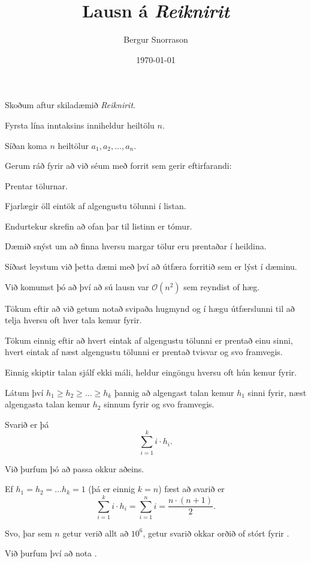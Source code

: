 \title{Lausn á \emph{Reiknirit}}
\author{Bergur Snorrason}
\date{\today}



\frame{\titlepage}

{
	{
		\item<1-> Skoðum aftur skiladæmið \emph{Reiknirit}.
		\item<2-> Fyrsta lína inntaksins inniheldur heiltölu $n$.
		\item<3-> Síðan koma $n$ heiltölur $a_1, a_2, \dots, a_n$.
		\item<4-> Gerum ráð fyrir að við séum með forrit sem gerir eftirfarandi:
		{
			\item<5-> Prentar tölurnar.
			\item<6-> Fjarlægir öll eintök af algengustu tölunni í listan.
			\item<7-> Endurtekur skrefin að ofan þar til listinn er tómur.
		}
		\item<8-> Dæmið snýst um að finna hversu margar tölur eru prentaðar í heildina.
	}
}

{
	{
		\item<1-> Síðast leystum við þetta dæmi með því að útfæra forritið sem er lýst í dæminu.
		\item<2-> Við komumst þó að því að sú lausn var $\mathcal{O}(n^2)$ sem reyndist of hæg.
		\item<3-> Tökum eftir að við getum notað svipaða hugmynd og í hægu útfærslunni til að telja hversu oft hver tala kemur fyrir.
		\item<4-> Tökum einnig eftir að hvert eintak af algengustu tölunni er prentað einu sinni,
					hvert eintak af næst algengustu tölunni er prentað tvisvar
					og svo framvegis.
		\item<5-> Einnig skiptir talan sjálf ekki máli, heldur eingöngu hversu oft hún kemur fyrir.
	}
}

{
	{
		\item<1-> Látum því $h_1 \geq h_2 \geq \dots \geq h_k$ þannig að algengast talan kemur $h_1$ sinni fyrir,
					næst algengasta talan kemur $h_2$ sinnum fyrir
					og svo framvegis.
		\item<2-> Svarið er þá
		\[
			\sum_{i = 1}^k i \cdot h_i.
		\]
		\item<3-> Við þurfum þó að passa okkur aðeins.
		\item<4-> Ef $h_1 = h_2 = \dots h_k = 1$ (þá er einnig $k = n$) fæst að svarið er
		\[
			\sum_{i = 1}^k i \cdot h_i
			=
			\sum_{i = 1}^n i
			=
			\frac{n \cdot (n + 1)}{2}.
		\]
		\item<5-> Svo, þar sem $n$ getur verið allt að $10^6$, getur svarið okkar orðið of stórt fyrir .
		\item<6-> Við þurfum því að nota .
	}
}

